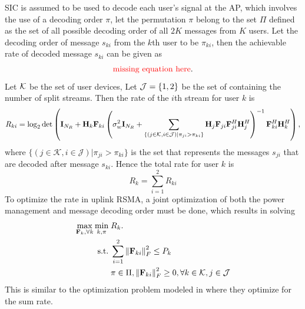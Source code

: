 \documentclass[a4paper, 12pt, onecolumn, journal, twoside, draftclsnofoot]{IEEEtran}
\begin{document}
SIC is assumed to be used to decode each user's signal at the AP, which involves the use of a decoding order $\pi$, let the permutation $\pi$ belong to the set $\Pi$ defined as the set of all possible decoding order of all $2K$ messages from $K$ users.  Let the decoding order of message $s_{ki}$ from the $k$th user to be $\pi_{ki}$, then the achievable rate of decoded message $s_{ki}$ can be given as
\begin{equation*}
	\text{\textcolor{red}{missing equation here}.}
\end{equation*}
Let ${ \mathcal{K} }$ be the set of user devices, Let ${ \mathcal{J} } = \{1, 2 \}$ be the set of containing the number of split streams.  Then the rate of the $i$th stream for user $k$ is
\begin{equation*}
	R_{ki} = \log_2 \det \left(  {\bf I}_{N_R}  +  {\bf H}_k {\bf F}_{ki}     \left(  \sigma_w^2 {\bf I}_{N_R}  + \sum_{\{(j{\in}\mathcal{K},i{\in}\mathcal{J})|\pi_{ji}{>}\pi_{ki}\}}  {\bf H}_j {\bf F}_{ji} {\bf F}_{ji}^H {\bf H}_j^H  \right)^{-1}     {\bf F}_{ki}^H {\bf H}_k^H  \right), 
\end{equation*}
where $\{(j{\in}\mathcal{K},i{\in}\mathcal{J})|\pi_{ji}{>}\pi_{ki}\}$ is the set that represents  the messages $s_{ji}$ that are decoded after  message $s_{ki}$.  Hence the total rate for user $k$ is
\begin{equation*}
    R_k = \sum^2_{i=1} R_{ki}
\end{equation*}
To optimize the rate in uplink RSMA, a joint optimization of both the power management and message decoding order must be done, which results in solving 
\begin{equation*}
	\begin{split}
		\max_{{\bf F}_k, \forall k}  \min_{k, \pi} &\; R_k.  \\
    	\mathrm{s.t.} &\; \sum_{i=1}^2 \left\| {\bf F}_{ki} \right\|_F^2  \leq P_k \\
    	&\; \pi \in \Pi, \left\| {\bf F}_{ki} \right\|_F^2 \geq  0, \forall k \in { \mathcal{K} }, j \in { \mathcal{J} } 
    \end{split}
\end{equation*}
This is similar to the optimization problem modeled in \cite{yang2019} where they optimize for the sum rate.
\end{document}
